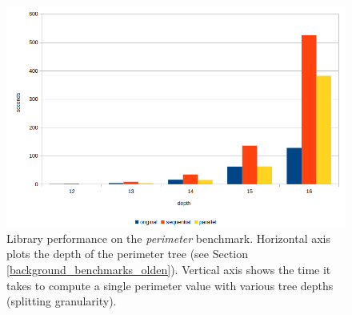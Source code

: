 \begin{figure}[!htb]
\includegraphics[width=1.0\textwidth]{images/perimeter.png}
\caption{Library performance on the \textit{perimeter} benchmark. Horizontal axis plots the depth of the perimeter tree (see Section \ref{background_benchmarks_olden}). Vertical axis shows the time it takes to compute a single perimeter value with various tree depths (splitting granularity).}
\label{fig:performance_perimeter}
\end{figure}

